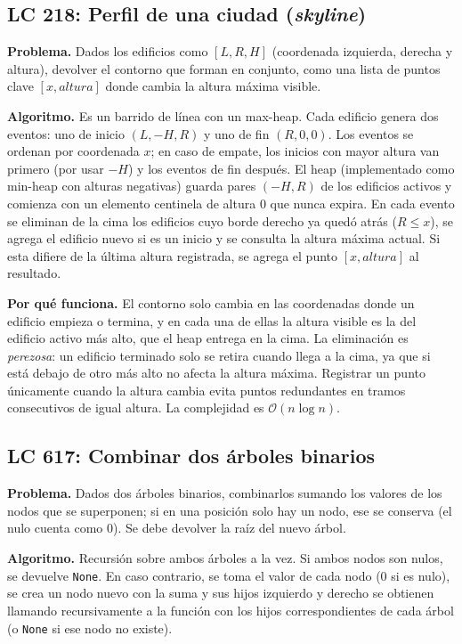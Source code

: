 \documentclass[11pt,letterpaper]{article}
\newcommand{\bigO}[1]{\ensuremath{\mathcal{O}(#1)}}
\begin{document}
\subsection{LC 218: Perfil de una ciudad (\emph{skyline})}

\textbf{Problema.} Dados los edificios como $[L, R, H]$ (coordenada izquierda, derecha y altura), devolver el contorno que forman en conjunto, como una lista de puntos clave $[x, altura]$ donde cambia la altura máxima visible.

\textbf{Algoritmo.} Es un barrido de línea con un max-heap. Cada edificio genera dos eventos: uno de inicio $(L, -H, R)$ y uno de fin $(R, 0, 0)$. Los eventos se ordenan por coordenada $x$; en caso de empate, los inicios con mayor altura van primero (por usar $-H$) y los eventos de fin después. El heap (implementado como min-heap con alturas negativas) guarda pares $(-H, R)$ de los edificios activos y comienza con un elemento centinela de altura 0 que nunca expira. En cada evento se eliminan de la cima los edificios cuyo borde derecho ya quedó atrás ($R \le x$), se agrega el edificio nuevo si es un inicio y se consulta la altura máxima actual. Si esta difiere de la última altura registrada, se agrega el punto $[x, altura]$ al resultado.

\textbf{Por qué funciona.} El contorno solo cambia en las coordenadas donde un edificio empieza o termina, y en cada una de ellas la altura visible es la del edificio activo más alto, que el heap entrega en la cima. La eliminación es \emph{perezosa}: un edificio terminado solo se retira cuando llega a la cima, ya que si está debajo de otro más alto no afecta la altura máxima. Registrar un punto únicamente cuando la altura cambia evita puntos redundantes en tramos consecutivos de igual altura. La complejidad es \bigO{n \log n}.

\subsection{LC 617: Combinar dos árboles binarios}

\textbf{Problema.} Dados dos árboles binarios, combinarlos sumando los valores de los nodos que se superponen; si en una posición solo hay un nodo, ese se conserva (el nulo cuenta como 0). Se debe devolver la raíz del nuevo árbol.

\textbf{Algoritmo.} Recursión sobre ambos árboles a la vez. Si ambos nodos son nulos, se devuelve \texttt{None}. En caso contrario, se toma el valor de cada nodo (0 si es nulo), se crea un nodo nuevo con la suma y sus hijos izquierdo y derecho se obtienen llamando recursivamente a la función con los hijos correspondientes de cada árbol (o \texttt{None} si ese nodo no existe).
\end{document}
